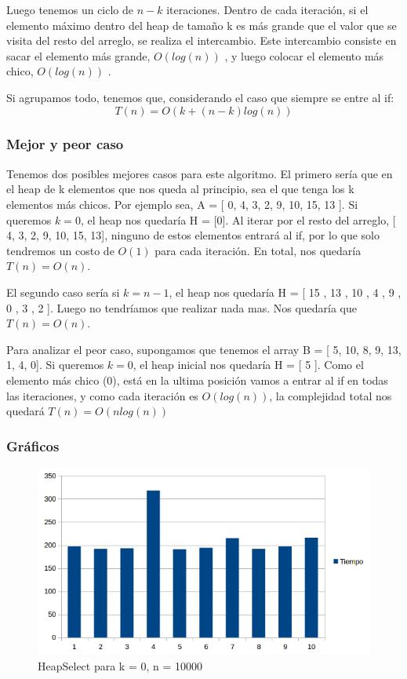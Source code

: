 Luego tenemos un ciclo de $n - k$ iteraciones. Dentro de cada iteración, si el elemento máximo dentro del heap de tamaño k es más grande que el valor que se visita del resto del arreglo, se realiza el intercambio. Este intercambio consiste en sacar el elemento más grande, $O(log(n))$ \cite{STD_POPHEAP}, y luego colocar el elemento más chico, $O(log(n))$ \cite{STD_PUSHHEAP}.

Si agrupamos todo, tenemos que, considerando el caso que siempre se entre al if:
$$ T(n) = O(k + (n-k)log(n)) $$

\subsubsection{Mejor y peor caso}
Tenemos dos posibles mejores casos para este algoritmo.
El primero sería que en el heap de k elementos que nos queda al principio, sea el que tenga los k elementos más chicos. Por ejemplo sea, A = [ 0, 4, 3, 2, 9, 10, 15, 13 ].
Si queremos $k = 0$, el heap nos quedaría H = [0]. Al iterar por el resto del arreglo, [ 4, 3, 2, 9, 10, 15, 13], ninguno de estos elementos entrará al if, por lo que solo tendremos un costo de $O(1)$ para cada iteración.
En total, nos quedaría $T(n) = O(n)$.

El segundo caso sería si $k = n-1$, el heap nos quedaría H = [ 15 , 13 , 10 , 4 , 9 , 0 , 3 , 2 ]. Luego no tendríamos que realizar nada mas. Nos quedaría que $T(n) = O(n)$.

Para analizar el peor caso, supongamos que tenemos el array B = [ 5, 10, 8, 9, 13, 1, 4, 0].
Si queremos $k = 0$, el heap inicial nos quedaría H = [ 5 ]. Como el elemento más chico (0), está en la ultima posición vamos a entrar al if en todas las iteraciones, y como cada iteración es $O(log(n))$, la complejidad total nos quedará $T(n) = O(n log(n))$

\subsubsection{Gráficos}
\begin{figure}[H]
\centering
\includegraphics[width=\textwidth]{KZero/HeapSelectK0.png}
\caption{HeapSelect para k = 0, n = 10000}
\end{figure}

